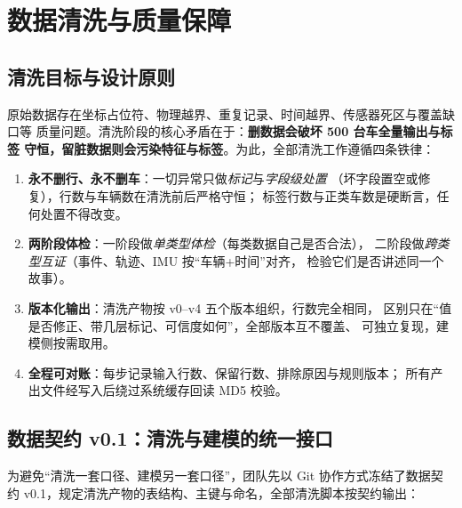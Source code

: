 \section{数据清洗与质量保障}

\subsection{清洗目标与设计原则}

原始数据存在坐标占位符、物理越界、重复记录、时间越界、传感器死区与覆盖缺口等
质量问题。清洗阶段的核心矛盾在于：\textbf{删数据会破坏 500 台车全量输出与标签
守恒，留脏数据则会污染特征与标签}。为此，全部清洗工作遵循四条铁律：

\begin{enumerate}[label=\textbf{P\arabic*.}]
  \item \textbf{永不删行、永不删车}：一切异常只做\emph{标记}与\emph{字段级处置}
        （坏字段置空或修复），行数与车辆数在清洗前后严格守恒；
        标签行数与正类车数是硬断言，任何处置不得改变。
  \item \textbf{两阶段体检}：一阶段做\emph{单类型体检}（每类数据自己是否合法），
        二阶段做\emph{跨类型互证}（事件、轨迹、IMU 按“车辆+时间”对齐，
        检验它们是否讲述同一个故事）。
  \item \textbf{版本化输出}：清洗产物按 v0--v4 五个版本组织，行数完全相同，
        区别只在“值是否修正、带几层标记、可信度如何”，全部版本互不覆盖、
        可独立复现，建模侧按需取用。
  \item \textbf{全程可对账}：每步记录输入行数、保留行数、排除原因与规则版本；
        所有产出文件经写入后绕过系统缓存回读 MD5 校验。
\end{enumerate}

\subsection{数据契约 v0.1：清洗与建模的统一接口}

为避免“清洗一套口径、建模另一套口径”，团队先以 Git 协作方式冻结了数据契约
v0.1，规定清洗产物的表结构、主键与命名，全部清洗脚本按契约输出：

